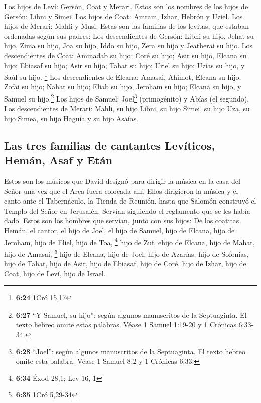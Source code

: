  Los hijos de Leví: Gersón, Coat y Merari.
 Estos son los nombres de los hijos de Gersón: Libni y
Simei.  Los hijos de Coat: Amram, Izhar, Hebrón y Uziel.
 Los hijos de Merari: Mahli y Musi. Estas son las
familias de los levitas, que estaban ordenadas según sus padres:
 Los descendientes de Gersón: Libni su hijo, Jehat su
hijo, Zima su hijo,  Joa su hijo, Iddo su hijo, Zera su
hijo y Jeatherai su hijo.  Los descendientes de Coat:
Aminadab su hijo; Coré su hijo; Asir su hijo,  Elcana su
hijo; Ebiasaf su hijo; Asir su hijo;  Tahat su hijo;
Uriel su hijo; Uzías su hijo, y Saúl su hijo. \footnote{\textbf{6:24}
  1Cró 15,17}  Los descendientes de Elcana: Amasai,
Ahimot,  Elcana su hijo; Zofai su hijo; Nahat su hijo;
 Eliab su hijo, Jeroham su hijo; Elcana su hijo, y Samuel
su hijo.\footnote{\textbf{6:27} ``Y Samuel, su hijo'': según algunos
  manuscritos de la Septuaginta. El texto hebreo omite estas palabras.
  Véase 1 Samuel 1:19-20 y 1 Crónicas 6:33-34.}  Los
hijos de Samuel: Joel\footnote{\textbf{6:28} ``Joel'': según algunos
  manuscritos de la Septuaginta. El texto hebreo omite esta palabra.
  Véase 1 Samuel 8:2 y 1 Crónicas 6:33.} (primogénito) y Abías (el
segundo).  Los descendientes de Merari: Mahli, su hijo
Libni, su hijo Simei, su hijo Uza,  su hijo Simea, su
hijo Haguía y su hijo Asaías.

\hypertarget{las-tres-familias-de-cantantes-levuxedticos-hemuxe1n-asaf-y-etuxe1n}{%
\subsection{Las tres familias de cantantes Levíticos, Hemán, Asaf y
Etán}\label{las-tres-familias-de-cantantes-levuxedticos-hemuxe1n-asaf-y-etuxe1n}}

 Estos son los músicos que David designó para dirigir la
música en la casa del Señor una vez que el Arca fuera colocada allí.
 Ellos dirigieron la música y el canto ante el
Tabernáculo, la Tienda de Reunión, hasta que Salomón construyó el Templo
del Señor en Jerusalén. Servían siguiendo el reglamento que se les había
dado.  Estos son los hombres que servían, junto con sus
hijos: De los coatitas Hemán, el cantor, el hijo de Joel, el hijo de
Samuel,  hijo de Elcana, hijo de Jeroham, hijo de Eliel,
hijo de Toa, \footnote{\textbf{6:34} Éxod 28,1; Lev 16,-1}
 hijo de Zuf, ehijo de Elcana, hijo de Mahat, hijo de
Amasai, \footnote{\textbf{6:35} 1Cró 5,29-34}  hijo de
Elcana, hijo de Joel, hijo de Azarías, hijo de Sofonías, 
hijo de Tahat, hijo de Asir, hijo de Ebiasaf, hijo de Coré,
 hijo de Izhar, hijo de Coat, hijo de Leví, hijo de
Israel.

